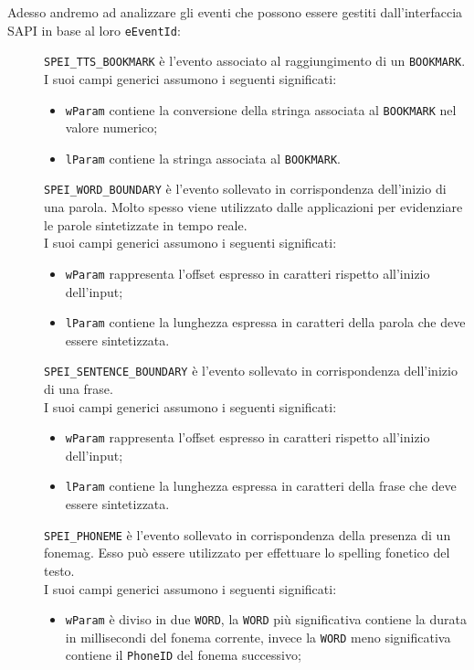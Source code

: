 Adesso andremo ad analizzare gli eventi che possono essere gestiti dall'interfaccia SAPI in base al loro \texttt{eEventId}: 
\begin{description}
	\item [] \texttt{SPEI\_TTS\_BOOKMARK} è l'evento associato al raggiungimento di un \texttt{BOOKMARK}.\\
	I suoi campi generici assumono i seguenti significati:
	\begin{itemize}
		\item \texttt{wParam} contiene la conversione della stringa associata al \texttt{BOOKMARK} nel valore numerico;
		\item \texttt{lParam} contiene la stringa associata al \texttt{BOOKMARK}.
	\end{itemize}
	\item [] \texttt{SPEI\_WORD\_BOUNDARY} è l'evento sollevato in corrispondenza dell'inizio di una parola. Molto spesso viene utilizzato dalle applicazioni per evidenziare le parole sintetizzate in tempo reale.\\
	I suoi campi generici assumono i seguenti significati:
	\begin{itemize}
		\item \texttt{wParam} rappresenta l'offset espresso in caratteri rispetto all'inizio dell'input;
		\item \texttt{lParam} contiene la lunghezza espressa in caratteri della parola che deve essere sintetizzata.
	\end{itemize}
	\item [] \texttt{SPEI\_SENTENCE\_BOUNDARY} è l'evento sollevato in corrispondenza dell'inizio di una frase.\\
	I suoi campi generici assumono i seguenti significati:
	\begin{itemize}
		\item \texttt{wParam} rappresenta l'offset espresso in caratteri rispetto all'inizio dell'input;
		\item \texttt{lParam} contiene la lunghezza espressa in caratteri della frase che deve essere sintetizzata.
	\end{itemize}
	\item [] \texttt{SPEI\_PHONEME} è l'evento sollevato in corrispondenza della presenza di un \gls{fonemag}. Esso può essere utilizzato per effettuare lo spelling fonetico del testo.\\
	I suoi campi generici assumono i seguenti significati:
	\begin{itemize}
		\item \texttt{wParam} è diviso in due \texttt{WORD}, la \texttt{WORD} più significativa contiene la durata in millisecondi del fonema corrente, invece la \texttt{WORD} meno significativa contiene il \texttt{PhoneID} del fonema successivo;

\end{itemize}
\end{description}
